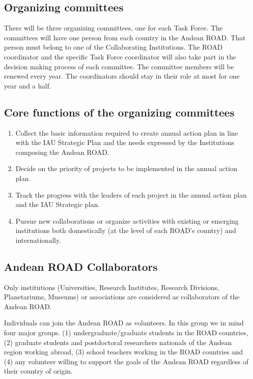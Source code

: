 \documentclass[12pt]{article}
\begin{document}
\subsection*{Organizing committees}


There will be three organizing committees, one for each Task
Force. The committees will have one person from each country in the
Andean ROAD. That person must belong to one of the Collaborating
Institutions. The ROAD coordinator and the specific Task Force
coordinator will also take part in the decision making process of each
committee. The committee members will be renewed every year. The
coordinators should stay in their role at most for one year and a
half. 

\subsection*{Core functions of the organizing committees}
\begin{enumerate}
\item Collect the basic information required to create annual action
  plan in line with the IAU Strategic Plan and the needs expressed by
  the Institutions composing the Andean ROAD. 
\item Decide on the priority of projects to be implemented in the
  annual action plan. 
\item Track the progress with the leaders of each project in the
  annual action plan and the IAU Strategic plan. 
\item Pursue new collaborations or organize activities with existing
  or emerging institutions both domestically (at the level of each
  ROAD’s country) and internationally. 
 \end{enumerate}

\subsection*{Andean ROAD Collaborators}


Only institutions (Universities, Research Institutes, Research
Divisions, Planetariums, Museums) or associations are considered
as collaborators of the Andean ROAD. 


Individuals can join the Andean ROAD as volunteers. In this group we
in mind four major groups. (1) undergraduate/graduate students in the
ROAD countries, (2) graduate students and postdoctoral researchers
nationals of the Andean region working abroad, (3) school teachers
working in the ROAD countries and (4) any volunteer willing to support
the goals of the Andean ROAD regardless of their country of origin. 
\end{document}
